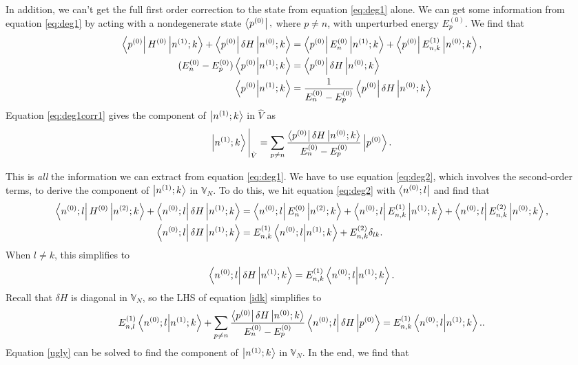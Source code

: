 In addition, we can't get the full first order correction to the state from equation \ref{eq:deg1} alone. We can get some information from equation \ref{eq:deg1} by acting with a nondegenerate state $\left\langle p^{(0)} \right|,$ where $p \neq n$, with unperturbed energy $E_p^{(0)}$. We find that
\begin{align}
\left\langle p^{(0)} \right|H^{(0)} \left| n^{(1)};k \right\rangle+\left\langle p^{(0)} \right| \delta H \left| n^{(0)};k \right\rangle &= \left\langle p^{(0)} \right|E_n^{(0)} \left| n^{(1)};k \right\rangle+\left\langle p^{(0)} \right|E_{n,k}^{(1)} \left| n^{(0)};k \right\rangle,\nonumber \\
(E_n^{(0)}-E_p^{(0)}) \left\langle p^{(0)} \middle| n^{(1)};k \right\rangle &= \left\langle p^{(0)} \right| \delta H \left| n^{(0)};k \right\rangle \nonumber \\
\left\langle p^{(0)} \middle| n^{(1)};k \right\rangle &=  \frac{1}{E_n^{(0)}-E_p^{(0)}}\left\langle p^{(0)} \right| \delta H \left| n^{(0)};k \right\rangle \label{eq:deg1corr1}
\end{align}
Equation \ref{eq:deg1corr1} gives the component of $\left| n^{(1)};k \right\rangle$ in $\hat{V}$ as 
\begin{equation}
\left| n^{(1)};k \right\rangle\Bigg\rvert_{\hat{V}} = 
\sum\limits_{p \neq n} \frac{\left\langle p^{(0)} \right| \delta H 
\left| n^{(0)};k \right\rangle}{E_n^{(0)}-E_p^{(0)}} \left| p^{(0)} \right\rangle\label{eq:deg1corr1s}.\end{equation}

This is \textit{all} the information we can extract from equation \ref{eq:deg1}. We have to use equation \ref{eq:deg2}, which involves the second-order terms, to derive the component of $\left| n^{(1)};k \right\rangle$ in $\mathbb{V}_N$. To do this, we hit equation \ref{eq:deg2} with $\left\langle n^{(0)}; l \right|$ and find that
\begin{align*}
\left\langle n^{(0)}; l \right|H^{(0)} \left| n^{(2)};k \right\rangle + \left\langle n^{(0)}; l \right|\delta H \left| n^{(1)};k \right\rangle &= \left\langle n^{(0)}; l \right|E_n^{(0)} \left| n^{(2)};k \right\rangle + \left\langle n^{(0)}; l \right| E_{n,k}^{(1)} \left| n^{(1)};k \right\rangle + \left\langle n^{(0)}; l \right| E_{n,k}^{(2)} \left| n^{(0)};k \right\rangle, \\
\left\langle n^{(0)}; l \right|\delta H \left| n^{(1)};k \right\rangle &= E_{n,k}^{(1)} \left\langle n^{(0)};l \middle| n^{(1)};k \right\rangle + E_{n,k}^{(2)} \delta_{lk}.
\end{align*}
When $l \neq k$, this simplifies to 
\begin{equation}
\left\langle n^{(0)}; l \right|\delta H \left| n^{(1)};k \right\rangle = E_{n,k}^{(1)} \left\langle n^{(0)};l \middle| n^{(1)};k \right\rangle. \label{idk}
\end{equation}
Recall that $\delta H$ is diagonal in $\mathbb{V}_N$, so the LHS of equation \ref{idk} simplifies to 
\begin{equation}
E_{n,l}^{(1)} \left\langle n^{(0)};l \middle| n^{(1)};k \right\rangle + \sum\limits_{p \neq n} \frac{\left\langle p^{(0)} \right| \delta H 
\left| n^{(0)};k \right\rangle}{E_n^{(0)}-E_p^{(0)}} \left\langle n^{(0)}; l \right|\delta H \left| p^{(0)} \right\rangle
 = E_{n,k}^{(1)} \left\langle n^{(0)};l \middle| n^{(1)};k \right\rangle. \label{ugly}.
\end{equation}
Equation \ref{ugly} can be solved to find the component of $\left| n^{(1)};k \right\rangle$ in $\mathbb{V}_N$. In the end, we find that

